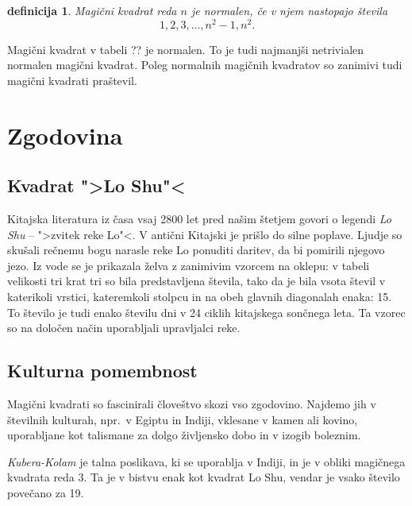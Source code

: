 \documentclass[a4paper,12pt]{article}
\newtheorem{Definicija}{definicija}}
\begin{document}
\begin{Definicija}
   Magični kvadrat reda \(n\) je \emph{normalen}, če v njem nastopajo števila
   \begin{equation}
      1, 2, 3, \ldots, n^2-1, n^2.
   \end{equation}
\end{Definicija}

Magični kvadrat v tabeli ?? je normalen.
To je tudi najmanjši netrivialen normalen magični kvadrat.
Poleg normalnih magičnih kvadratov so zanimivi tudi magični kvadrati praštevil. %


\section{Zgodovina}

\subsection{Kvadrat ">Lo Shu"<}

Kitajska literatura iz časa vsaj 2800 let pred našim štetjem govori o legendi
\emph{Lo Shu} -- ">zvitek reke Lo"<. V antični Kitajski je prišlo do
silne poplave. Ljudje so skušali rečnemu bogu narasle reke Lo ponuditi daritev,
da bi pomirili njegovo jezo. Iz vode se je prikazala želva z zanimivim vzorcem
na oklepu: v tabeli velikosti tri krat tri so bila predstavljena števila, tako
da je bila vsota števil v katerikoli vrstici, kateremkoli stolpcu in na obeh
glavnih diagonalah enaka: 15. To število je tudi enako številu dni v 24 ciklih
kitajskega sončnega leta. Ta vzorec so na določen način uporabljali upravljalci
reke.


\subsection{Kulturna pomembnost}

Magični kvadrati so fascinirali človeštvo skozi vso zgodovino. Najdemo jih
v številnih kulturah, npr.\ v Egiptu in Indiji, vklesane v kamen ali
kovino, uporabljane kot talismane za dolgo življensko dobo in v
izogib boleznim.

\emph{Kubera-Kolam} je talna poslikava, ki se uporablja v Indiji, in je v
obliki magičnega kvadrata reda 3. Ta je v bistvu enak kot kvadrat
Lo Shu, vendar je vsako število povečano za 19.
\end{document}
